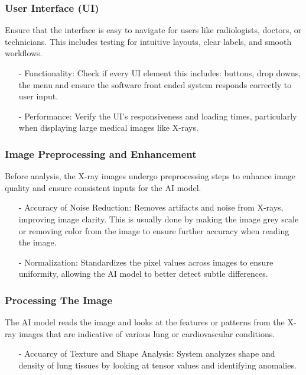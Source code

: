 \documentclass[12pt, titlepage]{article}
\begin{document}
\subsubsection{User Interface (UI)}
Ensure that the interface is easy to navigate for users like radiologists, doctors, or technicians. This includes testing for intuitive layouts, clear labels, and smooth workflows.
\begin{itemize}
    \item[-] Functionality: Check if every UI element this includes: buttons, drop downs, the menu and ensure the software front ended system responds correctly to user input.
    \item[-] Performance: Verify the UI's responsiveness and loading times, particularly when displaying large medical images like X-rays.
\end{itemize}

\subsubsection{Image Preprocessing and Enhancement}
Before analysis, the X-ray images undergo preprocessing steps to enhance image quality and ensure consistent inputs for the AI model.
\begin{itemize}
    \item[-] Accuracy of Noise Reduction: Removes artifacts and noise from X-rays, improving image clarity. This is usually done by making the image grey scale or removing color from the image to ensure further accuracy when reading the image. 
    \item[-] Normalization: Standardizes the pixel values across images to ensure uniformity, allowing the AI model to better detect subtle differences.
\end{itemize}

\subsubsection{Processing The Image}
The AI model reads the image and looks at the features or patterns from the X-ray images that are indicative of various lung or cardiovascular conditions.
\begin{itemize}
    \item[-] Accuarcy of Texture and Shape Analysis: System analyzes shape and density of lung tissues by looking at tensor values and identifying anomalies.
\end{itemize}
\end{document}
